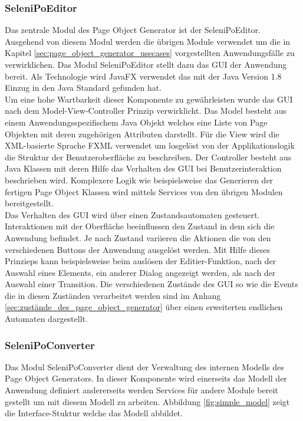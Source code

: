 \subsubsection{SeleniPoEditor}
\label{sec:selenipoeditor}

Das zentrale Modul des Page Object Generator ist der SeleniPoEditor.
Ausgehend von diesem Modul werden die übrigen Module verwendet um die in Kapitel \ref{sec:page_object_generator_usecases} vorgestellten Anwendungsfälle zu verwirklichen.
Das Modul SeleniPoEditor stellt dazu das GUI der Anwendung bereit.
Als Technologie wird JavaFX \cite{oracle_client_2015} verwendet das mit der Java Version 1.8 Einzug in den Java Standard gefunden hat. \\
Um eine hohe Wartbarkeit dieser Komponente zu gewährleisten wurde das GUI nach dem Model-View-Controller Prinzip verwirklicht.
Das Model besteht aus einem Anwendungsspezifischem Java Objekt welches eine Liste von Page Objekten mit deren zugehörigen Attributen darstellt.
Für die View wird die XML-basierte Sprache FXML verwendet um losgelöst von der Applikationslogik die Struktur der Benutzeroberfläche zu beschreiben.
Der Controller besteht aus Java Klassen mit deren Hilfe das Verhalten des GUI bei Benutzerinteraktion beschrieben wird.
Komplexere Logik wie beispielsweise das Generieren der fertigen Page Object Klassen wird mittels Services von den übrigen Modulen bereitgestellt.\\
Das Verhalten des GUI wird über einen Zustandsautomaten gesteuert.
Interaktionen mit der Oberfläche beeinflussen den Zustand in dem sich die Anwendung befindet. Je nach Zustand variieren die Aktionen die von den verschiedenen Buttons der Anwendung ausgelöst werden.
Mit Hilfe dieses Prinzieps kann beispielsweise beim auslösen der Editier-Funktion, nach der Auswahl eines Elements, ein anderer Dialog angezeigt werden, als nach der Auswahl einer Transition.
Die verschiedenen Zustände des GUI so wie die Events die in diesen Zuständen verarbeitet werden sind im Anhang \ref{sec:zustände_des_page_object_generator} über einen erweiterten endlichen Automaten dargestellt.

\subsubsection{SeleniPoConverter}
\label{sec:selenipoconverter}
Das Modul SeleniPoConverter dient der Verwaltung des internen Modells des Page Object Generators. In dieser Komponente wird einerseits das Modell der Anwendung definiert andererseits werden Services für andere Module bereit gestellt um mit diesem Modell zu arbeiten.
Abbildung \ref{fig:simple_model} zeigt die Interface-Stuktur welche das Modell abbildet.

